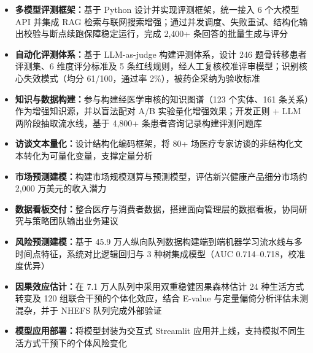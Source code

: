 
\begin{itemize}
  \item \textbf{多模型评测框架：}基于 Python 设计并实现评测框架，统一接入 6 个大模型 API 并集成 RAG 检索与联网搜索增强；通过并发调度、失败重试、结构化输出校验与断点续跑保障稳定运行，完成 2,400+ 条回答的批量生成与评分
  \item \textbf{自动化评测体系：}基于 LLM-as-judge 构建评测体系，设计 246 题骨转移患者评测集、6 维度评分标准及 5 条红线规则，经人工复核校准评审模型；识别核心失效模式（均分 61/100，通过率 2\%），被药企采纳为验收标准
  \item \textbf{知识与数据构建：}参与构建经医学审核的知识图谱（123 个实体、161 条关系）作为增强知识源，并以盲法配对 A/B 实验量化增强效果；开发正则 + LLM 两阶段抽取流水线，基于 4,800+ 条患者咨询记录构建评测问题库
\end{itemize}


\begin{itemize}
  \item \textbf{访谈文本量化：}设计结构化编码框架，将 80+ 场医疗专家访谈的非结构化文本转化为可量化变量，支撑定量分析
  \item \textbf{市场预测建模：}构建市场规模测算与预测模型，评估新兴健康产品细分市场约 2,000 万美元的收入潜力
  \item \textbf{数据看板交付：}整合医疗与消费者数据，搭建面向管理层的数据看板，协同研究与策略团队输出业务建议
\end{itemize}



\begin{itemize}
  \item \textbf{风险预测建模：}基于 45.9 万人纵向队列数据构建端到端机器学习流水线与多时间点特征，系统对比逻辑回归与 3 种树集成模型（AUC 0.714–0.718，校准度优异）
  \item \textbf{因果效应估计：}在 7.1 万人队列中采用双重稳健因果森林估计 24 种生活方式转变及 120 组联合干预的个体化效应，结合 E-value 与定量偏倚分析评估未测混杂，并于 NHEFS 队列完成外部验证
  \item \textbf{模型应用部署：}将模型封装为交互式 Streamlit 应用并上线，支持模拟不同生活方式干预下的个体风险变化
\end{itemize}

